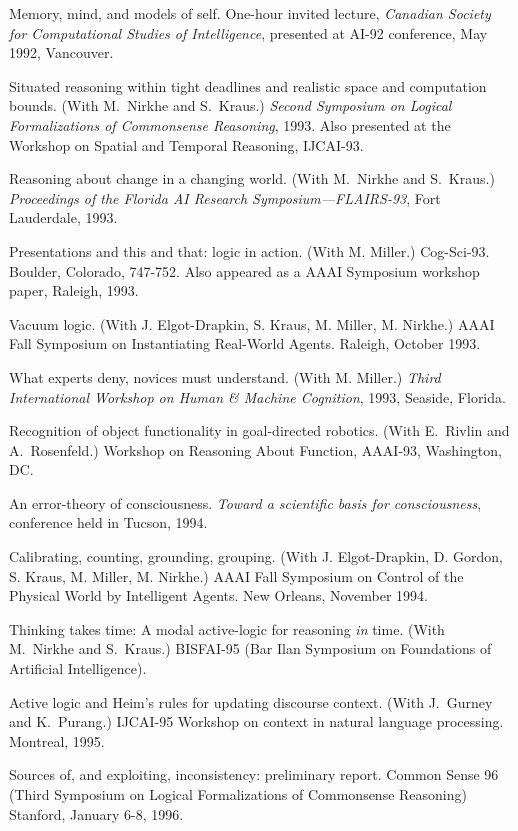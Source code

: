 \paper
Memory, mind, and models of self. One-hour invited
lecture, {\sl Canadian Society for Computational Studies of
Intelligence}, presented at AI-92 conference, May 1992, Vancouver.

\paper
Situated reasoning within tight deadlines and realistic space and
computation bounds. 
(With M.~Nirkhe and S.~Kraus.)
{\sl Second Symposium on Logical Formalizations of Commonsense Reasoning},
1993. Also presented at the Workshop on Spatial and Temporal
Reasoning, IJCAI-93.

\paper
Reasoning about change in a changing world.
(With M.~Nirkhe and S.~Kraus.)
{\sl Proceedings of the Florida AI Research Symposium---FLAIRS-93},
Fort Lauderdale, 1993.

\paper
Presentations and this and that: logic in action.
(With M. Miller.) Cog-Sci-93. Boulder, Colorado, 747-752. Also
appeared as a AAAI Symposium workshop paper, Raleigh, 1993.

\paper
Vacuum logic.
(With J. Elgot-Drapkin, S. Kraus, M. Miller, M. Nirkhe.)
AAAI Fall Symposium on Instantiating Real-World Agents.
Raleigh, October 1993.

\paper
What experts deny, novices must understand.
(With M. Miller.) {\sl Third International Workshop on 
Human \& Machine Cognition}, 1993, Seaside, Florida.

\paper
Recognition of object functionality in goal-directed robotics.
(With E.~Rivlin and A.~Rosenfeld.)  Workshop on Reasoning About Function,
AAAI-93, Washington, DC.

\paper
An error-theory of consciousness. {\sl Toward a scientific basis for
consciousness}, conference held in Tucson, 1994.

\paper
Calibrating, counting, grounding, grouping.
(With J. Elgot-Drapkin, D. Gordon, S. Kraus, M. Miller, M.
Nirkhe.) AAAI Fall Symposium on Control of the Physical World 
by Intelligent Agents. New Orleans, November 1994.

\paper
Thinking takes time: A modal active-logic for reasoning {\sl in} time.
(With M.~Nirkhe and S.~Kraus.) BISFAI-95 (Bar Ilan
Symposium on Foundations of Artificial Intelligence).

\paper
Active logic and Heim's rules for updating discourse context.
(With J.~Gurney and K.~Purang.) IJCAI-95 Workshop on
context in natural language processing. Montreal, 1995.

\paper
Sources of, and exploiting, inconsistency: preliminary report.
Common Sense 96 (Third Symposium on Logical Formalizations of
Commonsense Reasoning) Stanford, January 6-8, 1996.


